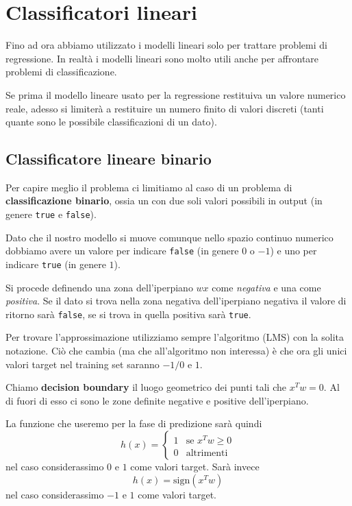 \chapter{Classificatori lineari}
Fino ad ora abbiamo utilizzato i modelli lineari solo per trattare problemi di regressione. In realt\`a i modelli
lineari sono molto utili anche per affrontare problemi di classificazione.

Se prima il modello lineare usato per la regressione restituiva un valore numerico reale, adesso si limiter\`a a
restituire un numero finito di valori discreti (tanti quante sono le possibile classificazioni di un dato).

\section{Classificatore lineare binario}
Per capire meglio il problema ci limitiamo al caso di un problema di \textbf{classificazione binario}, ossia un con
due soli valori possibili in output (in genere \verb|true| e \verb|false|).

Dato che il nostro modello si muove comunque nello spazio continuo numerico dobbiamo avere un valore per indicare
\verb|false| (in genere $0$ o $-1$) e uno per indicare \verb|true| (in genere $1$).

Si procede definendo una zona dell'iperpiano $wx$ come \emph{negativa} e una come \emph{positiva}. Se il dato si
trova nella zona negativa dell'iperpiano negativa il valore di ritorno sar\`a \verb|false|, se si trova in quella
positiva sar\`a \verb|true|.

Per trovare l'approssimazione utilizziamo sempre l'algoritmo (LMS) con la solita notazione. Ci\`o che cambia (ma
che all'algoritmo non interessa) \`e che ora gli unici valori target nel training set saranno $-1/0$ e $1$.

\begin{definition}
	Chiamo \textbf{decision boundary} il luogo geometrico dei punti tali che $x^T w = 0$. Al di fuori di esso ci sono
	le zone definite negative e positive dell'iperpiano.
\end{definition}
La funzione che useremo per la fase di predizione sar\`a quindi
\[
	h(x) = \begin{cases}
		1 & \text{se } x^T w \geq 0 \\
		0 & \text{altrimenti}
	\end{cases}
\]
nel caso considerassimo $0$ e $1$ come valori target. Sar\`a invece
\[ h(x) = \text{sign}(x^T w) \]
nel caso considerassimo $-1$ e $1$ come valori target.

